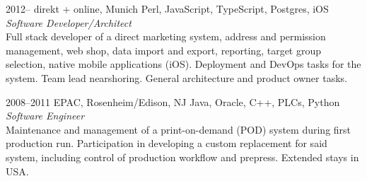 \documentclass[]{friggeri-cv-a4}
\begin{document}

\begin{entrylist}
\entry
{2012--}
{direkt + online, Munich}
{Perl, JavaScript, TypeScript, Postgres, iOS}
{\emph{Software Developer/Architect} \\
Full stack developer of a direct marketing system, address and permission management, web shop, data import and export, reporting, target group selection, native mobile applications (iOS). Deployment and DevOps tasks for the system. Team lead nearshoring. General architecture and product owner tasks.}
\end{entrylist}


\begin{entrylist}
\entry
{2008--2011}
{EPAC, Rosenheim/Edison, NJ}
{Java, Oracle, C++, PLCs, Python}
{\emph{Software Engineer} \\
Maintenance and management of a print-on-demand (POD) system during first production run. Participation in developing a custom replacement for said system, including control of production workflow and prepress. Extended stays in USA.}
\end{entrylist}
\end{document}
